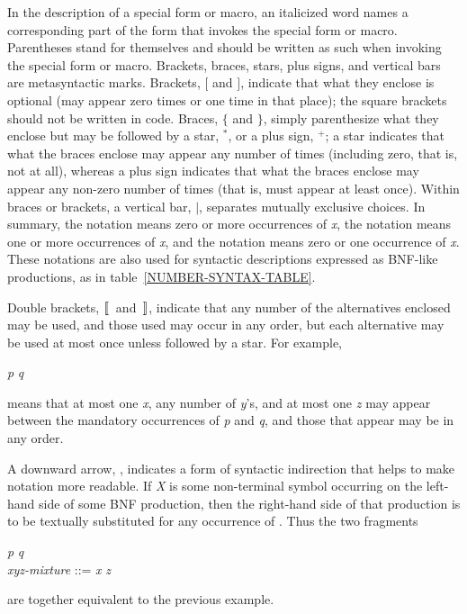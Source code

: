 In the description of a special form or macro, an italicized word names a
corresponding part of the form that invokes the special form or macro.
Parentheses stand for themselves and should be
written as such when invoking the special form or macro.
Brackets, braces, stars, plus signs, and vertical bars are metasyntactic
marks.
Brackets,
$\lbrack$ and $\rbrack$, indicate that what they enclose is optional
(may appear zero times or one time in that place); the square
brackets should not be written in code.
Braces, $\lbrace$ and $\rbrace$, simply parenthesize what they enclose
but may be followed by a star, ${}^*$, or a plus sign, ${}^+$;
a star indicates that what the braces enclose may appear any number of times
(including zero, that is, not at all), whereas a plus sign indicates
that what the braces enclose may appear any non-zero number of times
(that is, must appear at least once).  Within braces or brackets,
a vertical bar, $|$, separates mutually exclusive choices.
In summary, the notation  means zero or more occurrences
of {\it x}, the notation  means one or more occurrences
of {\it x}, and the notation  means zero or one occurrence
of {\it x}.  These notations are also used for syntactic
descriptions expressed as BNF-like productions, as
in table~\ref{NUMBER-SYNTAX-TABLE}.

\begin{newer}
Double brackets, $\dlbrack$ and $\drbrack$, indicate that any number of the
alternatives enclosed may be used, and those used
may occur in any order, but each
alternative may be used at most once unless followed by a star.
For example,
\begin{tabbing}
{\it p}  {\it q}
\end{tabbing}
means that
at most one {\it x}, any number of {\it y}'s, and at most one {\it z}
may appear between the mandatory occurrences of {\it p}
and {\it q}, and those that appear may be in any order.

A downward arrow, \Mind{}, indicates a form of syntactic indirection
that helps to make \Mchoice{~} notation more readable.  If {\it X} is
some non-terminal symbol occurring on the left-hand side of some BNF
production, then the right-hand
side of that production is to be textually substituted for any occurrence
of .  Thus the two fragments
\begin{tabbing}
{\it p}  {\it q} \\
{\it xyz-mixture} ::= {\it x\/} {\Mor}  {\Mor} {\it z\/}
\end{tabbing}
are together equivalent to the previous example.
\end{newer}

